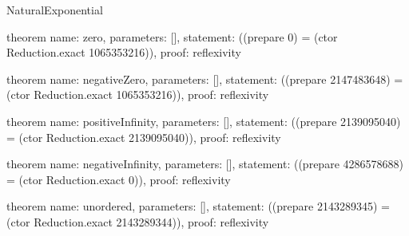 \begin{lexlean}{NaturalExponential}
\begin{semanticmodule}
theorem{
  name: zero,
  parameters: [],
  statement: ((prepare 0) = (ctor Reduction.exact 1065353216)),
  proof: reflexivity{}
}

theorem{
  name: negativeZero,
  parameters: [],
  statement: ((prepare 2147483648) = (ctor Reduction.exact 1065353216)),
  proof: reflexivity{}
}

theorem{
  name: positiveInfinity,
  parameters: [],
  statement: ((prepare 2139095040) = (ctor Reduction.exact 2139095040)),
  proof: reflexivity{}
}

theorem{
  name: negativeInfinity,
  parameters: [],
  statement: ((prepare 4286578688) = (ctor Reduction.exact 0)),
  proof: reflexivity{}
}

theorem{
  name: unordered,
  parameters: [],
  statement: ((prepare 2143289345) = (ctor Reduction.exact 2143289344)),
  proof: reflexivity{}
}
\end{semanticmodule}
\end{lexlean}
